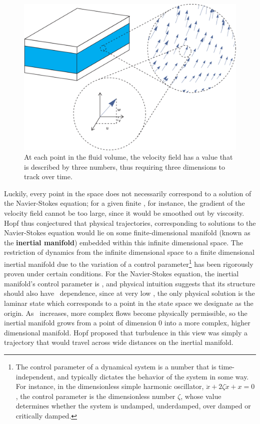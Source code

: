 \begin{figure}
\centerline{
\includegraphics[scale=0.6]{Figs/VectorSpace}}
\caption{At each point in the fluid volume, the velocity field has a value that is described by three numbers, thus requiring three dimensions to track over time.}\label{fig:VectorSpace}
\end{figure}


Luckily, every point in the space does not necessarily correspond to a solution of the Navier-Stokes equation; for a given finite \ReN, for instance, the gradient of the velocity field cannot be too large, since it would be smoothed out by viscosity. Hopf thus conjectured that physical trajectories, corresponding to solutions to the Navier-Stokes equation would lie on some finite-dimensional manifold (known as the {\bf inertial manifold}) embedded within this infinite dimensional space. The restriction of dynamics from the infinite dimensional space to a finite dimensional inertial manifold due to the variation of a control parameter\footnote{The control parameter of a dynamical system is a number that is time-independent, and typically dictates the behavior of the system in some way. For instance, in the dimensionless simple harmonic oscillator, $\ddot{x} + 2\zeta \dot{x} + x = 0$, the control parameter is the dimensionless number $\zeta$, whose value determines whether the system is undamped, underdamped, over damped or critically damped.} has been rigorously proven under certain conditions. For the Navier-Stokes equation, the inertial manifold's control parameter is \ReN, and physical intuition suggests that its structure should also have \ReN~dependence, since at very low \ReN, the only physical solution is the laminar state which corresponds to a point in the state space we designate as the origin. As \ReN\ increases, more complex flows become physically permissible, so the inertial manifold grows from a point of dimension 0 into a more complex, higher dimensional manifold. Hopf proposed that turbulence in this view was simply a trajectory that would travel across wide distances on the inertial manifold. \\


